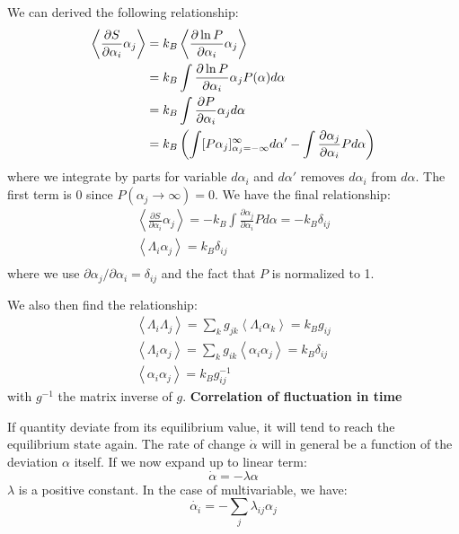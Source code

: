 \documentclass{article}
\newcommand{\pfrac}[2]{\frac{\partial #1}{\partial #2}}
\begin{document}
We can derived the following relationship:
\begin{align}
    \left\langle \pfrac{S}{\alpha_i} \alpha_j \right\rangle 
    &= k_B \left\langle \pfrac{\ln P}{\alpha_i} \alpha_j \right\rangle \notag \\
    &= k_B \int \pfrac{\ln P}{\alpha_i} \alpha_j P(\alpha) d\alpha \notag \\
    &= k_B \int \pfrac{P}{\alpha_i} \alpha_j  d\alpha \notag \\
    &= k_B \left( \int [P\alpha_j]_{\alpha_j = -\infty}^{\infty}  d\alpha' - \int \pfrac{\alpha_j}{\alpha_i} P d\alpha \right)\notag \\
\end{align}
where we integrate by parts for variable $d\alpha_i$ and $d\alpha'$ removes $d\alpha_i$ from $d\alpha$. The 
first term is 0 since $P(\alpha_j \to \infty) = 0$. We have the final relationship:
\begin{gather}
    \left\langle \pfrac{S}{\alpha_i} \alpha_j \right\rangle  = - k_B \int \pfrac{\alpha_j}{\alpha_i} P d\alpha = -k_B \delta_{ij} \\
    \left\langle \Lambda_i \alpha_j \right\rangle = k_B \delta_{ij} \label{derive} \\
\end{gather}
where we use $\partial \alpha_j / \partial \alpha_i = \delta_{ij}$ and the fact that $P$ is normalized to 1.

We also then find the relationship:
\begin{gather}
    \left\langle \Lambda_i \Lambda_j \right\rangle = \sum_k g_{jk} \left\langle \Lambda_i \alpha_k \right\rangle 
    = k_B g_{ij} \\
    \left\langle \Lambda_i \alpha_j \right\rangle = \sum_k g_{ik} \left\langle \alpha_i \alpha_j \right\rangle 
    = k_B \delta_{ij} \\
    \left\langle \alpha_i \alpha_j \right\rangle = k_B g^{-1}_{ij}
\end{gather}
with $g^{-1}$ the matrix inverse of $g$. 
\newline
\textbf{Correlation of fluctuation in time} 

If quantity deviate from its equilibrium value, it will tend to reach 
the equilibrium state again. The rate of change $\dot{\alpha}$ will in general 
be a function of the deviation $\alpha$ itself. 
If we now expand up to linear term:
\begin{equation}
    \dot{\alpha} = - \lambda \alpha
\end{equation}
$\lambda$ is a positive constant. In the case of multivariable, we 
have:
\begin{equation}
    \dot{\alpha_i} = - \sum_{j} \lambda_{ij} \alpha_j  \label{recover}
\end{equation}
\end{document}
